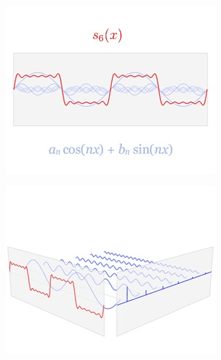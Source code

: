 \documentclass[10pt,fancyhdr,graybox, envcountchap,oribibl,twoside]{svmono}
\begin{document}
\begin{figure}
\begin{fullwidth}
	\begin{subfigure}[b]{0.33\textwidth}
		\includegraphics[width=1.\textwidth]{figures/intro/fourier-1}
	\end{subfigure}
	\begin{subfigure}[b]{0.33\textwidth}
		\includegraphics[width=1.\textwidth]{figures/intro/fourier-2}
	\end{subfigure}
	\begin{subfigure}[b]{0.33\textwidth}

\end{subfigure}
\end{fullwidth}
\end{figure}
\end{document}
